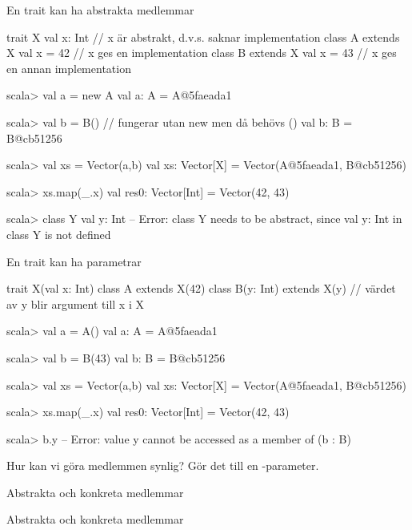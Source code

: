 \begin{Slide}{En trait kan ha abstrakta medlemmar}
\begin{Code}
trait X { val x: Int }   // x är abstrakt, d.v.s. saknar implementation
class A extends X { val x = 42 }   // x ges en implementation
class B extends X { val x = 43 }   // x ges en annan implementation
\end{Code}
\pause\vspace{-0.5em}
\begin{REPL}
scala> val a = new A
val a: A = A@5faeada1

scala> val b = B()    // fungerar utan new men då behövs ()
val b: B = B@cb51256

scala> val xs = Vector(a,b)
val xs: Vector[X] = Vector(A@5faeada1, B@cb51256)

scala> xs.map(_.x)
val res0: Vector[Int] = Vector(42, 43)

scala> class Y { val y: Int }
-- Error: 
  class Y needs to be abstract, since val y: Int in class Y is not defined
\end{REPL}
\end{Slide}

\begin{Slide}{En trait kan ha parametrar}
\begin{Code}
trait X(val x: Int)
class A extends X(42)  
class B(y: Int) extends X(y) // värdet av y blir argument till x i X  
\end{Code}
\pause\vspace{-0.5em}
\begin{REPL}
scala> val a = A()
val a: A = A@5faeada1

scala> val b = B(43)
val b: B = B@cb51256

scala> val xs = Vector(a,b)
val xs: Vector[X] = Vector(A@5faeada1, B@cb51256)

scala> xs.map(_.x)
val res0: Vector[Int] = Vector(42, 43)

scala> b.y 
--  Error: 
  value y cannot be accessed as a member of (b : B)
\end{REPL}
\SlideFontTiny
Hur kan vi göra medlemmen  synlig? \pause Gör det till en -parameter.
\end{Slide}
  


\ifkompendium
\begin{Slide}{Abstrakta och konkreta medlemmar}
\end{Slide}
\else
\begin{Slide}{Abstrakta och konkreta medlemmar}
\vspace{-0.5em}
\end{Slide}
\fi

